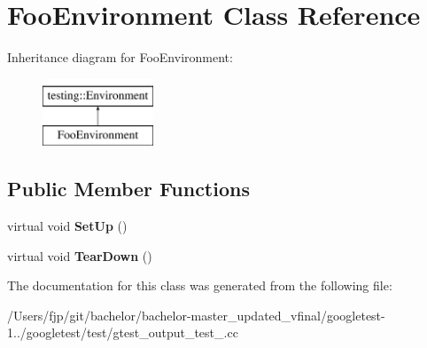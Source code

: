 \hypertarget{class_foo_environment}{}\section{Foo\+Environment Class Reference}
\label{class_foo_environment}
Inheritance diagram for Foo\+Environment\+:\begin{figure}[H]
\begin{center}
\leavevmode
\includegraphics[height=2.000000cm]{class_foo_environment}
\end{center}
\end{figure}
\subsection*{Public Member Functions}
\begin{DoxyCompactItemize}
\item 
\mbox{\label{class_foo_environment_a7db8d8b312805aff437ae8534132a56d}} 
virtual void {\bfseries Set\+Up} ()
\item 
\mbox{\label{class_foo_environment_a99a2c9df52106cce9e7a4bdda53df802}} 
virtual void {\bfseries Tear\+Down} ()
\end{DoxyCompactItemize}


The documentation for this class was generated from the following file\+:\begin{DoxyCompactItemize}
\item 
/\+Users/fjp/git/bachelor/bachelor-\/master\+\_\+updated\+\_\+vfinal/googletest-\/1../googletest/test/gtest\+\_\+output\+\_\+test\+\_\+.\+cc\end{DoxyCompactItemize}
